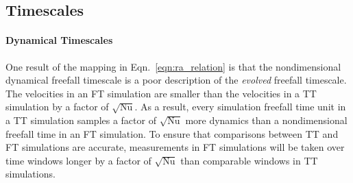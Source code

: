 \documentclass[aps, pre, onecolumn, nofootinbib, notitlepage, groupedaddress, amsfonts, amssymb, amsmath, longbibliography, superscriptaddress]{revtex4-1}
\newcommand{\ea}[1]{{\color{red} #1}}
\begin{document}
\ea{
\subsection{Timescales}
\label{sec:timescales}
}
\paragraph{Dynamical Timescales}
One \ea{result of the mapping in Eqn.~\ref{eqn:ra_relation}} is that the nondimensional dynamical freefall timescale is a poor description of the \emph{evolved} freefall timescale.
The velocities in an FT simulation are smaller than the velocities in a TT simulation by a factor of $\sqrt{\text{Nu}}$.
As a result, every simulation freefall time unit in a TT simulation samples a factor of $\sqrt{\text{Nu}}$ more dynamics than a nondimensional freefall time in an FT simulation.
\ea{To ensure that comparisons between TT and FT simulations are accurate, measurements in FT simulations will be taken over time windows longer by a factor of $\sqrt{\text{Nu}}$ than comparable windows in TT simulations.}
\end{document}
